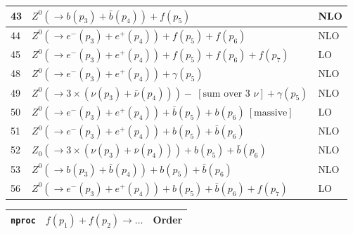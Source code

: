 \documentclass[12pt]{article}
\begin{document}
\begin{itemize}
\begin{table}
\begin{center}
\begin{tabular}{|l|l|l|}
43& $ Z^0(\to b(p_3)+\bar{b}(p_4))+f(p_5) $ & NLO \\
\hline 
44& $ Z^0(\to e^-(p_3)+e^+(p_4))+f(p_5)+f(p_6) $ & NLO \\
45& $ Z^0(\to e^-(p_3)+e^+(p_4))+f(p_5)+f(p_6)+f(p_7) $ & LO \\
\hline 
48& $ Z^0(\to e^-(p_3)+e^+(p_4))+\gamma(p_5) $ & NLO \\
49& $ Z^0(\to 3\times(\nu(p_3)+\bar{\nu}(p_4)))-~[ \mbox{sum over 3 $\nu$} ]+\gamma(p_5) $ & NLO \\
\hline 
50& $ Z^0(\to e^-(p_3)+e^+(p_4))+\bar{b}(p_5)+b(p_6) ~[ \mbox{massive} ] $ & LO \\
51& $ Z^0(\to e^-(p_3)+e^+(p_4))+b(p_5)+\bar{b}(p_6) $ & NLO \\
52& $ Z_0(\to 3\times(\nu(p_3)+\bar{\nu}(p_4)))+b(p_5)+\bar{b}(p_6) $ & NLO \\
53& $ Z^0(\to b(p_3)+\bar{b}(p_4))+b(p_5)+\bar{b}(p_6) $ & NLO \\
56& $ Z^0(\to e^-(p_3)+e^+(p_4))+b(p_5)+\bar{b}(p_6)+f(p_7) $ & LO \\
\hline 
\end{tabular}
\end{center}
\end{table}
\begin{table}
\begin{center}
\hspace*{-1.5cm}
\begin{tabular}{|l|l|l|}
\hline
{\tt nproc} & $ f(p_1)+f(p_2) \to \ldots $& Order \\ 
\hline


\end{tabular}
\end{center}
\end{table}
\end{itemize}
\end{document}
